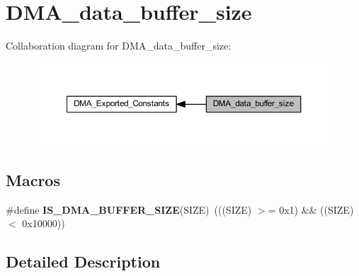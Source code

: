 \hypertarget{group___d_m_a__data__buffer__size}{}\section{D\+M\+A\+\_\+data\+\_\+buffer\+\_\+size}
\label{group___d_m_a__data__buffer__size}
Collaboration diagram for D\+M\+A\+\_\+data\+\_\+buffer\+\_\+size\+:
\nopagebreak
\begin{figure}[H]
\begin{center}
\leavevmode
\includegraphics[width=350pt]{group___d_m_a__data__buffer__size}
\end{center}
\end{figure}
\subsection*{Macros}
\begin{DoxyCompactItemize}
\item 
\mbox{\label{group___d_m_a__data__buffer__size_ga72ef4033bb3bc2cdfdbe579083b05e32}} 
\#define {\bfseries I\+S\+\_\+\+D\+M\+A\+\_\+\+B\+U\+F\+F\+E\+R\+\_\+\+S\+I\+ZE}(S\+I\+ZE)~(((S\+I\+ZE) $>$= 0x1) \&\& ((\+S\+I\+Z\+E) $<$ 0x10000))
\end{DoxyCompactItemize}


\subsection{Detailed Description}
